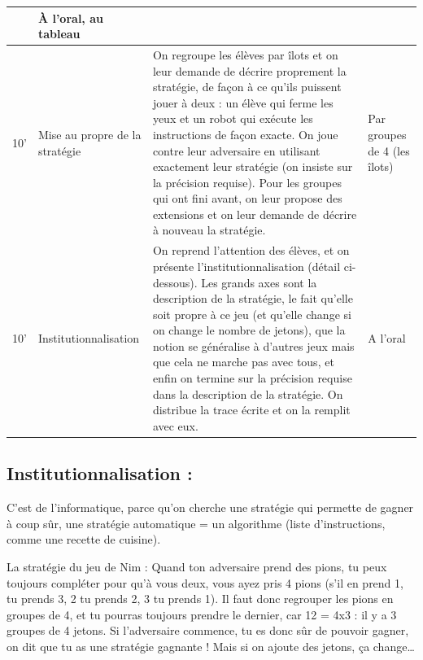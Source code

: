 \documentclass[12pt, a4paper]{article}
\begin{document}
\begin{longtable}{c|m{3.9cm}|m{8.4cm}|m{2.4cm}}
		& 
		
		À l'oral, au tableau
		
		\\ \hline
		
		10' 
		
		&
		
		Mise au propre de la stratégie 
		
		&
		
		On regroupe les élèves par îlots et on leur demande de décrire proprement la stratégie, de façon à ce qu'ils puissent jouer à deux : un élève qui ferme les yeux et un robot qui
		exécute les instructions de façon exacte. On joue contre leur adversaire en utilisant exactement leur stratégie (on insiste sur la précision requise). 
		Pour les groupes qui ont fini avant, on leur propose des extensions et on leur demande de décrire à nouveau la stratégie. 
		
		&
		
		Par groupes de 4 (les îlots)
				
		\\ \hline
		
		10'
		
		&
		
		Institutionnalisation
		
		&
		
		On reprend l'attention des élèves, et on présente l'institutionnalisation (détail ci-dessous). Les grands axes sont la description de la stratégie, le fait qu'elle soit propre à ce jeu (et qu'elle change si on change le nombre de jetons), que la notion se généralise à d'autres jeux mais que cela ne marche pas avec tous, et enfin on termine sur la précision requise dans la description de la stratégie. On distribue la trace écrite et on la remplit avec eux.
		
		&
		
		A l'oral
		
	\end{longtable}
	
\newpage
	
\subsection*{Institutionnalisation :}
	
	C’est de l’informatique, parce qu’on cherche une stratégie qui permette de gagner à coup sûr, une stratégie automatique = un algorithme (liste d’instructions, comme une recette de cuisine).
	
	La stratégie du jeu de Nim : Quand ton adversaire prend des pions, tu peux toujours compléter pour qu’à vous deux, vous ayez pris 4 pions (s’il en prend 1, tu prends 3, 2 tu prends 2, 3 tu prends 1). Il faut donc regrouper les pions en groupes de 4, et tu pourras toujours prendre le dernier, car 12 = 4x3 : il y a 3 groupes de 4 jetons. Si l’adversaire commence, tu es donc sûr de pouvoir gagner, on dit que tu as une stratégie gagnante ! Mais si on ajoute des jetons, ça change…
	
\end{document}
